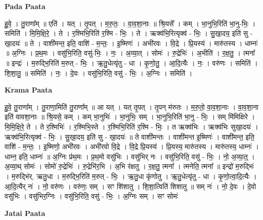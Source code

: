 \documentclass[17pt]{extarticle}
\begin{document}
\textbf{Pada Paata} \newline

हु॒वे॒ । तु॒राणा᳚म् ॥ एति॑ । यत् । तृ॒पत् । म॒रु॒तः॒ । वा॒व॒शा॒नाः ॥ श्रि॒यसे᳚ । कम् । भा॒नुभि॒रिति॑ भा॒नु-भिः॒ । समिति॑ । मि॒मि॒क्षि॒रे॒ । ते । र॒श्मिभि॒रिति॑ र॒श्मि - भिः॒ । ते । ऋक्व॑भि॒रित्यृक्व॑ - भिः॒ । सु॒खा॒दय॒ इति॑ सु - खा॒दयः॑ ॥ ते । वाशी॑मन्त॒ इति॒ वाशि॑ - म॒न्तः॒ । इ॒ष्मिणः॑ । अभी॑रवः । वि॒द्रे । प्रि॒यस्य॑ । मारु॑तस्य । धाम्नः॑ ॥ अ॒ग्निः । प्र॒थ॒मः । वसु॑भि॒रिति॒ वसु॑-भिः॒ । नः॒ । अ॒व्या॒त् । सोमः॑ । रु॒द्रेभिः॑ । अ॒भीति॑ । र॒क्ष॒तु॒ । त्मना᳚ ॥ इन्द्रः॑ । म॒रुद्भि॒रिति॑ म॒रुत् - भिः॒ । ऋ॒तु॒धेत्यृ॑तु - धा । कृ॒णो॒तु॒ । आ॒दि॒त्यैः । नः॒ । वरु॑णः । समिति॑ । शि॒शा॒तु॒ ॥ समिति॑ । नः॒ । दे॒वः । वसु॑भि॒रिति॒ वसु॑ - भिः॒ । अ॒ग्निः । समिति॑ ।  \newline


\textbf{Krama Paata} \newline

हु॒वे॒ तु॒राणा᳚म् । तु॒राणा॒मिति॑ तु॒राणा᳚म् ॥ आ यत् । यत् तृ॒पत् । तृ॒पन् म॑रुतः । म॒रु॒तो॒ वा॒व॒शा॒नाः । वा॒व॒शा॒ना इति॑ वावशा॒नाः ॥ श्रि॒यसे॒ कम् । कम् भा॒नुभिः॑ । भा॒नुभिः॒ सम् । भा॒नुभि॒रिति॑ भा॒नु - भिः॒ । सम् मि॑मिक्षिरे । मि॒मि॒क्षि॒रे॒ ते । ते र॒श्मिभिः॑ । र॒श्मिभि॒स्ते । र॒श्मिभि॒रिति॑ र॒श्मि - भिः॒ । त ऋक्व॑भिः । ऋक्व॑भिः सुखा॒दयः॑ । ऋक्व॑भि॒रित्यृक्व॑ - भिः॒ । सु॒खा॒दय॒ इति॑ सु - खा॒दयः॑ ॥ ते वाशी॑मन्तः । वाशी॑मन्त इ॒ष्मिणः॑ । वाशी॑मन्त॒ इति॒ वाशि॑ - म॒न्तः॒ । इ॒ष्मिणो॒ अभी॑रवः । अभी॑रवो वि॒द्रे । वि॒द्रे प्रि॒यस्य॑ । प्रि॒यस्य॒ मारु॑तस्य । मारु॑तस्य॒ धाम्नः॑ । धाम्न॒ इति॒ धाम्नः॑ ॥ अ॒ग्निः प्र॑थ॒मः । प्र॒थ॒मो वसु॑भिः । वसु॑भिर् नः । वसु॑भि॒रिति॒ वसु॑ - भिः॒ । नो॒ अ॒व्या॒त्॒ । अ॒व्या॒थ् सोमः॑ । सोमो॑ रु॒द्रेभिः॑ । रु॒द्रेभि॑र॒भि । अ॒भि र॑क्षतु । र॒क्ष॒तु॒ त्मना᳚ । त्मनेति॒ त्मना᳚ ॥ इन्द्रो॑ म॒रुद्भिः॑ । म॒रुद्भि॑र्. ऋतु॒धा । म॒रुद्भि॒रिति॑ म॒रुत् - भिः॒ । ऋ॒तु॒धा कृ॑णोतु । ऋ॒तु॒धेत्यृ॑तु - धा । कृ॒णो॒त्वा॒दि॒त्यैः । आ॒दि॒त्यैर् नः॑ । नो॒ वरु॑णः । वरु॑णः॒ सम् । सꣳ शि॑शातु । शि॒शा॒त्विति॑ शिशातु ॥ सम् नः॑ । नो॒ दे॒वः । दे॒वो वसु॑भिः । वसु॑भिर॒ग्निः । वसु॑भि॒रिति॒ वसु॑ - भिः॒ । अ॒ग्निः सम् । सꣳ सोमः॑ \newline

\textbf{Jatai Paata} \newline
\end{document}
